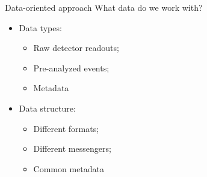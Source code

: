 \documentclass[18pt]{beamer}
\begin{document}
\begin{frame}{Data-oriented approach}
What data do we work with?


\parbox{0.48\textwidth}{
\begin{itemize}
  \item Data types:
  \begin{itemize}
    \item Raw detector readouts;
    \item Pre-analyzed events;
    \item Metadata
  \end{itemize}
\end{itemize}
}
\hfill
\parbox{0.48\textwidth}{
\begin{itemize}
  \item Data structure:
  \begin{itemize}
    \item Different formats;
    \item Different messengers;
    \item Common metadata
  \end{itemize}
\end{itemize}
}




\end{frame}
\end{document}
